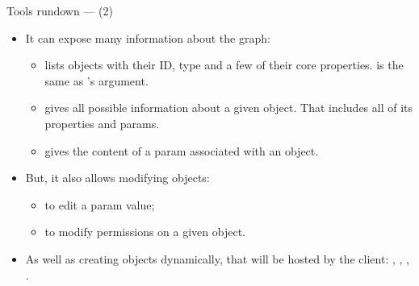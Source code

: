 \begin{frame}{Tools rundown —  (2)}
  \begin{itemize}

  \item It can expose many information about the graph:

    \begin{itemize}

    \item {} lists objects with their ID,
      type and a few of their core properties.  is the
      same as 's argument.

    \item {} gives all possible
      information about a given object. That includes all of its
      properties and params.

    \item {} gives the
      content of a param associated with an object.

    \end{itemize}

  \item But, it also allows modifying objects:

    \begin{itemize}
    \item {} to
      edit a param value;
    \item {}
      to modify permissions on a given object.
    \end{itemize}

  \item As well as creating objects dynamically, that will be hosted by
    the  client: , ,
    , .

  \end{itemize}
\end{frame}



